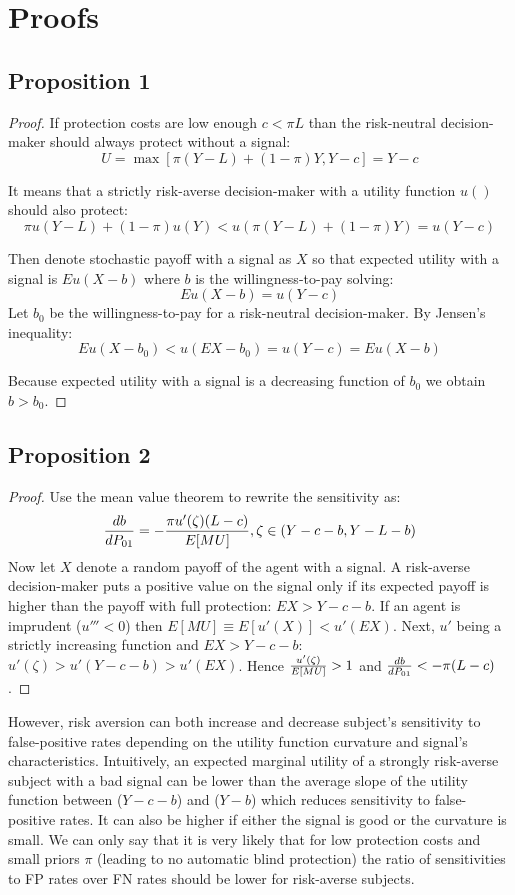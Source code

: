 \documentclass[12pt,a4paper]{article}
\begin{document}

\newpage
\section{Proofs}
\small

\subsection{Proposition 1}
\begin{proof} If protection costs are low enough $c<\pi L$ than the risk-neutral decision-maker should always protect without a signal:
$$U=\max[\pi(Y-L)+(1-\pi)Y,Y-c]=Y-c$$

It means that a strictly risk-averse decision-maker with a utility function $u()$ should also protect:
$$\pi u(Y-L)+(1-\pi)u(Y)<u(\pi(Y-L)+(1-\pi)Y)=u(Y-c)$$

Then denote stochastic payoff with a signal as $X$ so that expected utility with a signal is $Eu(X-b)$ where $b$ is the willingness-to-pay solving:
$$Eu(X-b)=u(Y-c)$$
 Let $b_0$ be the willingness-to-pay for a risk-neutral decision-maker. By Jensen's inequality:
$$Eu(X-b_0)<u(EX-b_0)=u(Y-c)=Eu(X-b)$$

Because expected utility with a signal is a decreasing function of $b_0$ we obtain $b>b_0$. \end{proof} 

\subsection{Proposition 2}
\begin{proof}
Use the mean value theorem to rewrite the sensitivity as:
$${db\over dP_{01}}=-{\pi u'(\zeta)(L-c)\over E[MU]},\zeta \in \left(Y-c-b, Y-L-b\right)$$
Now let $X$ denote a random payoff of the agent with a signal. A risk-averse decision-maker puts a positive value on the signal only if its expected payoff is higher than the payoff with full protection: $EX>Y-c-b$. If an agent is imprudent ($u'''<0$) then $E[MU]\equiv E[u'(X)]<u'(EX)$. Next, $u'$ being a strictly increasing function and $EX>Y-c-b$: $u'(\zeta)>u'(Y-c-b)>u'(EX)$. Hence ${u'(\zeta)\over E[MU]}>1$ and ${db\over dP_{01}}<-\pi(L-c)$. 
\end{proof}

However, risk aversion can both increase and decrease subject's sensitivity to false-positive rates depending on the utility function curvature and signal's characteristics. Intuitively, an expected marginal utility of a strongly risk-averse subject with a bad signal can be lower than the average slope of the utility function between ($Y-c-b$) and ($Y-b$) which reduces sensitivity to false-positive rates. It can also be higher if either the signal is good or the curvature is small. We can only say that it is very likely that for low protection costs and small priors $\pi$ (leading to no automatic blind protection) the ratio of sensitivities to FP rates over FN rates should be lower for risk-averse subjects. 
\end{document}
